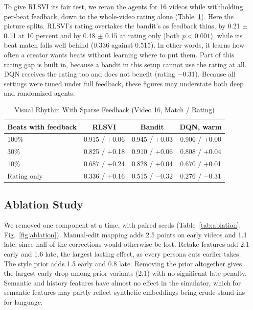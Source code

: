 \documentclass{ieeeaccess}
\begin{document}
To give RLSVI its fair test, we reran the agents for 16 videos while withholding per-beat feedback, down to the whole-video rating alone (Table~\ref{tab:delayed}). Here the picture splits. RLSVI's rating overtakes the bandit's as feedback thins, by 0.21 $\pm$ 0.11 at 10 percent and by 0.48 $\pm$ 0.15 at rating only (both $p<0.001$), while its beat match falls well behind (0.336 against 0.515). In other words, it learns how often a creator wants beats without learning where to put them. Part of this rating gap is built in, because a bandit in this setup cannot use the rating at all. DQN receives the rating too and does not benefit (rating $-$0.31). Because all settings were tuned under full feedback, these figures may understate both deep and randomized agents.

\begin{table}[t]
\caption{Visual Rhythm With Sparse Feedback (Video 16, Match / Rating)}
\label{tab:delayed}
\setlength{\tabcolsep}{3pt}
\centering
\begin{tabular}{|l|c|c|c|}
\hline
Beats with feedback & RLSVI & Bandit & DQN, warm \\
\hline
100\% & 0.915 / +0.06 & 0.945 / +0.03 & 0.906 / +0.00 \\
30\% & 0.825 / +0.18 & 0.910 / +0.06 & 0.808 / +0.04 \\
10\% & 0.687 / +0.24 & 0.828 / +0.04 & 0.670 / +0.01 \\
Rating only & 0.336 / +0.16 & 0.515 / $-$0.32 & 0.276 / $-$0.31 \\
\hline
\end{tabular}
\end{table}

\subsection{Ablation Study}
We removed one component at a time, with paired seeds (Table~\ref{tab:ablation}, Fig.~\ref{fig:ablation}). Manual-edit mapping adds 2.5 points on early videos and 1.1 late, since half of the corrections would otherwise be lost. Retake features add 2.1 early and 1.6 late, the largest lasting effect, as every persona cuts earlier takes. The style prior adds 1.5 early and 0.8 late. Removing the prior altogether gives the largest early drop among prior variants (2.1) with no significant late penalty. Semantic and history features have almost no effect in the simulator, which for semantic features may partly reflect synthetic embeddings being crude stand-ins for language.
\end{document}
